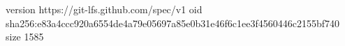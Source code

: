 version https://git-lfs.github.com/spec/v1
oid sha256:e83a4ccc920a6554de4a79e05697a85e0b31e46f6c1ee3f4560446c2155bf740
size 1585
